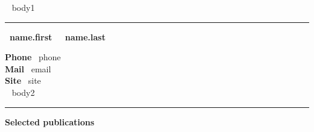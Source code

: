 \documentclass[a4paper]{article}
\newcommand{\block}[1]{\hrule \vspace{0.2cm} \textbf{\Large #1} \vspace{0.2cm}}
\newcommand{\Block}[1]{\hrule \vspace{0.2cm} \textbf{\huge #1} \vspace{0.2cm}}
\newcommand{\skill}[2]{\textbf{#1} \hfill #2 \\}
\begin{document}
\begin{minipage}[t]{0.6\columnwidth}
    ~{{ body1 }}~
\end{minipage} 
\hfill
\begin{minipage}[t]{0.375\columnwidth}
    
    \Block{\hfill ~{{name.first}}~ ~{{name.last}}~\hfill}

    \skill{Phone}{~{{phone}}~}
    \skill{Mail}{~{{email}}~}
    \skill{Site}{~{{site}}~}

    ~{{ body2 }}~
\end{minipage}

\block{Selected publications}

\nocite{*}
\printbibliography[heading=none]
\end{document}
